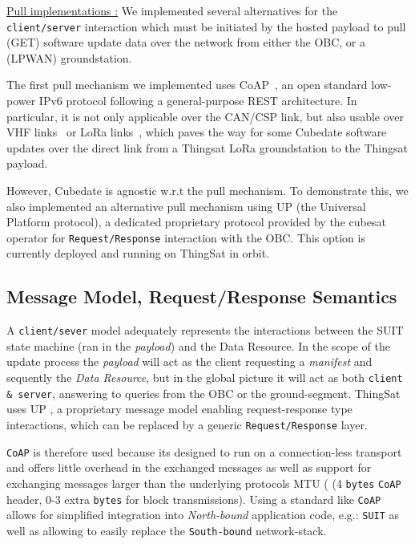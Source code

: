 \underline{Pull implementations :}
We implemented several alternatives for the \texttt{client/server} interaction which must be initiated by the hosted payload to pull (GET) software update data over the network from either the OBC, or a (LPWAN) groundstation.

The first pull mechanism we implemented uses CoAP~\cite{rfc7252}, an open standard low-power IPv6 protocol following a general-purpose REST architecture.
In particular, it is not only applicable over the CAN/CSP link, but also usable over VHF links~\cite{palma2018vhf-coap} or LoRa links~\cite{sanchez2018lora-coap}, which paves the way for some Cubedate software updates over the direct link from a Thingsat LoRa groundstation to the Thingsat payload.

However, Cubedate is agnostic w.r.t the pull mechanism. To demonstrate this, we also implemented an alternative pull mechanism using UP (the Universal Platform protocol), a dedicated proprietary protocol provided by the cubesat operator for \texttt{Request/Response} interaction with the OBC. This option is currently deployed and running on ThingSat in orbit. 

\iffalse

\subsection{Message Model, Request/Response Semantics}

A \texttt{client/sever} model adequately represents the interactions between the SUIT state
machine (ran in the \textit{payload}) and the Data Resource. In the scope of the
update process the \textit{payload} will act as the client requesting a \textit{manifest}
and sequently the \textit{Data Resource}, but in the global picture it will act
as both \texttt{client \& server}, answering to queries from the OBC or the
ground-segment. ThingSat uses UP , a proprietary message
model enabling request-response type interactions, which can be replaced by a
generic \texttt{Request/Response} layer.

\texttt{CoAP} is therefore used because its designed to run on a connection-less transport
and offers little overhead in the exchanged messages as well as support for exchanging
messages larger than the underlying protocols MTU (
(4 \texttt{bytes} \texttt{CoAP} header, 0-3 extra \texttt{bytes} for block transmissions).
Using a standard like \texttt{CoAP} allows for simplified integration into \textit{North-bound}
application code, e.g.: \texttt{SUIT} as well as allowing to easily replace the
\texttt{South-bound} network-stack.

